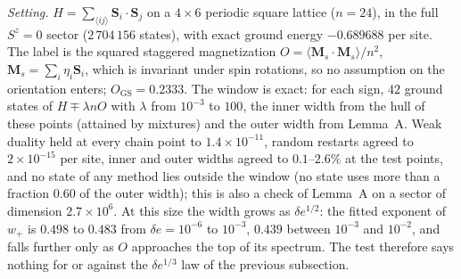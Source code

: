 \documentclass[aps,prx,onecolumn,10pt,nofootinbib,longbibliography,floatfix]{revtex4-2}
\theoremstyle{remark}
\newcommand{\de}{\delta e}
\newcommand{\GS}{\mathrm{GS}}
\begin{document}
\emph{Setting.} $H=\sum_{\langle ij\rangle}\bm S_i\cdot\bm S_j$ on a $4\times6$ periodic square lattice ($n=24$), in %
the full $S^z=0$ sector ($2\,704\,156$ states), with exact ground energy $-0.689688$ per site. The label is the %
squared staggered magnetization $O=\langle\bm M_s\cdot\bm M_s\rangle/n^2$, $\bm M_s=\sum_i\eta_i\bm S_i$, which is
invariant under spin rotations, so no assumption on the orientation enters; $O_\GS=0.2333$. The window is exact: for each sign, $42$ ground %
states of $H\mp\lambda nO$ with $\lambda$ from $10^{-3}$ to $100$, the inner width from the hull of these points %
(attained by mixtures) and the outer width from Lemma~A. Weak duality held at every chain point to %
$1.4\times10^{-11}$, random restarts agreed to $2\times10^{-15}$ per site, inner and outer widths agreed to %
$0.1$--$2.6\%$ at the test points, and no state of any method lies outside the window (no state uses more than a %
fraction $0.60$ of the outer width); this is also a check of Lemma~A on a sector of dimension $2.7\times10^6$. At this size the width grows %
as $\de^{1/2}$: the fitted exponent of $w_+$ is $0.498$ to $0.483$ from $\de=10^{-6}$ to $10^{-3}$, $0.439$ between %
$10^{-3}$ and $10^{-2}$, and falls further only as $O$ approaches the top of its spectrum. The test therefore says %
nothing for or against the $\de^{1/3}$ law of the previous subsection.
\end{document}
